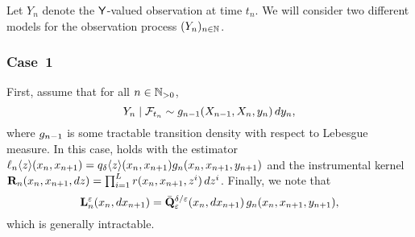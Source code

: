 \begin{example}
Let $Y_n$ denote the $\mathsf{Y}$-valued observation at time $t_n$. We will consider two different models for the observation process $(Y_n)_{n \in \mathbb{N}}$.    

\subsubsection*{Case~1}
First, assume that for all $n \in \mathbb{N}_{> 0}$, 
$$
Y_n \mid \mathcal{F}_{t_n} \sim g_{n - 1}(X_{n - 1}, X_n, y_n) \, d y_n, 
$$
where $g_{n - 1}$ is some tractable transition density with respect to Lebesgue measure. In this case,  holds with the estimator $\ell_{n} \langle z \rangle(x_n, x_{n + 1}) = q_\delta \langle z \rangle (x_n, x_{n + 1}) g_{n}(x_n, x_{n + 1}, y_{n + 1})$ and the instrumental kernel $\mathbf{R}_{n}(x_n, x_{n + 1}, d z) = \prod_{i = 1}^L r(x_n, x_{n + 1}, z^i) \, d z^i$. Finally, we note that 
\begin{equation} \label{eq:ukmod:durham:gallant}
\ukmod{n}(x_n, \rmd x_{n + 1}) = \bar{\kernel{Q}}_\precpar^{\delta / \precpar}(x_n, \rmd x_{n + 1}) \, \md{n}(x_n, x_{n + 1}, y_{n + 1}), 
\end{equation}
which is generally intractable.  


\end{example}
